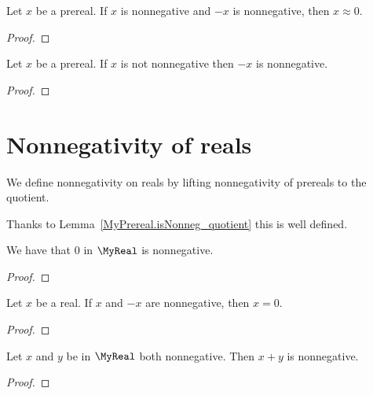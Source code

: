 \begin{lemma}
    \leanok
    Let $x$ be a prereal.
    If $x$ is nonnegative and $-x$ is nonnegative, then $x \approx 0$.
\end{lemma}
\begin{proof}
    \leanok
\end{proof}

\begin{lemma}
    \leanok
    Let $x$ be a prereal.
    If $x$ is not nonnegative then $-x$ is nonnegative.
\end{lemma}
\begin{proof}
\end{proof}

\section{Nonnegativity of reals}

\begin{definition}
    \leanok
    We define nonnegativity on reals by lifting nonnegativity of prereals to the quotient.

    Thanks to Lemma~\ref{MyPrereal.isNonneg_quotient} this is well defined.
\end{definition}

\begin{lemma}
    \leanok
    We have that $0$ in $\MyReal$ is nonnegative.
\end{lemma}
\begin{proof}
    \leanok
\end{proof}

\begin{lemma}
    \leanok
    Let $x$ be a real.
    If $x$ and $-x$ are nonnegative, then $x = 0$.
\end{lemma}
\begin{proof}
    \leanok
\end{proof}

\begin{lemma}
    \leanok
    Let $x$ and $y$ be in $\MyReal$ both nonnegative. Then $x+y$ is nonnegative.
\end{lemma}
\begin{proof}
    \leanok
\end{proof}

